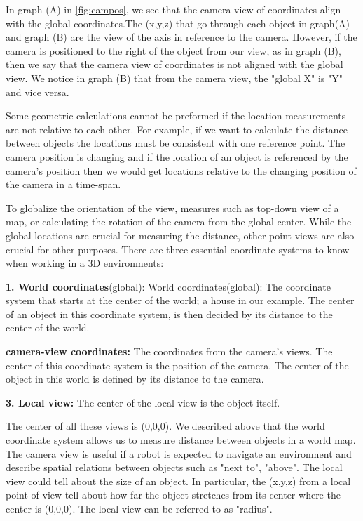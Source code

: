In graph (A) in \ref{fig:campos}, we see that the camera-view of coordinates align with the global coordinates.The (x,y,z) that go through each object in graph(A) and graph (B) are the view of the axis in reference to the camera. However, if the camera is positioned to the right of the object from our view, as in graph (B), then we say that the camera view of coordinates is not aligned with the global view. We notice in graph (B) that from the camera view, the "global X" is "Y" and vice versa.

Some geometric calculations cannot be preformed if the location measurements are not relative to each other. For example, if we want to calculate the distance between objects the locations must be consistent with one reference point. The camera position is changing and if the location of an object is referenced by the camera's position then we would get locations relative to the changing position of the camera in a time-span. 

To globalize the orientation of the view, measures such as top-down view of a map, or calculating the rotation of the camera from the global center. While the global locations are crucial for measuring the distance, other point-views are also crucial for other purposes. There are three essential coordinate systems to know when working in a 3D environments: 

\textbf{1. World coordinates}(global):  World coordinates(global): The coordinate system that starts at the center of the world; a house in our example. The center of an object in this coordinate system, is then decided by its distance to the center of the world. 

\textbf{camera-view coordinates:} The coordinates from the camera's views. The center of this coordinate system is the position of the camera. The center of the object in this world is defined by its distance to the camera. 

\textbf{3. Local view:} The center of the local view is the object itself. 

The center of all these views is (0,0,0). We described above that the world coordinate system allows us to measure distance between objects in a world map. The camera view is useful if a robot is expected to navigate an environment and describe spatial relations between objects such as "next to", "above". The local view could tell about the size of an object. In particular, the (x,y,z) from a local point of view tell about how far the object stretches from its center where the center is (0,0,0). The local view can be referred to as "radius". 

